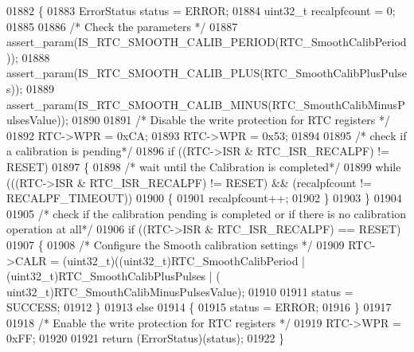 \begin{DoxyCode}
01882 \{
01883   ErrorStatus status = ERROR;
01884   uint32\_t recalpfcount = 0;
01885 
01886   \textcolor{comment}{/* Check the parameters */}
01887   assert_param(IS_RTC_SMOOTH_CALIB_PERIOD(RTC\_SmoothCalibPeriod));
01888   assert_param(IS_RTC_SMOOTH_CALIB_PLUS(RTC\_SmoothCalibPlusPulses));
01889   assert_param(IS_RTC_SMOOTH_CALIB_MINUS(RTC\_SmouthCalibMinusPulsesValue));
01890 
01891   \textcolor{comment}{/* Disable the write protection for RTC registers */}
01892   RTC->WPR = 0xCA;
01893   RTC->WPR = 0x53;
01894   
01895   \textcolor{comment}{/* check if a calibration is pending*/}
01896   \textcolor{keywordflow}{if} ((RTC->ISR & RTC_ISR_RECALPF) != RESET)
01897   \{
01898     \textcolor{comment}{/* wait until the Calibration is completed*/}
01899     \textcolor{keywordflow}{while} (((RTC->ISR & RTC_ISR_RECALPF) != RESET) && (recalpfcount != 
      RECALPF_TIMEOUT))
01900     \{
01901       recalpfcount++;
01902     \}
01903   \}
01904 
01905   \textcolor{comment}{/* check if the calibration pending is completed or if there is no calibration operation at all*/}
01906   \textcolor{keywordflow}{if} ((RTC->ISR & RTC_ISR_RECALPF) == RESET)
01907   \{
01908     \textcolor{comment}{/* Configure the Smooth calibration settings */}
01909     RTC->CALR = (uint32\_t)((uint32\_t)RTC\_SmoothCalibPeriod | (uint32\_t)RTC\_SmoothCalibPlusPulses | (
      uint32\_t)RTC\_SmouthCalibMinusPulsesValue);
01910 
01911     status = SUCCESS;
01912   \}
01913   \textcolor{keywordflow}{else}
01914   \{
01915     status = ERROR;
01916   \}
01917 
01918   \textcolor{comment}{/* Enable the write protection for RTC registers */}
01919   RTC->WPR = 0xFF;
01920   
01921   \textcolor{keywordflow}{return} (ErrorStatus)(status);
01922 \}
\end{DoxyCode}
